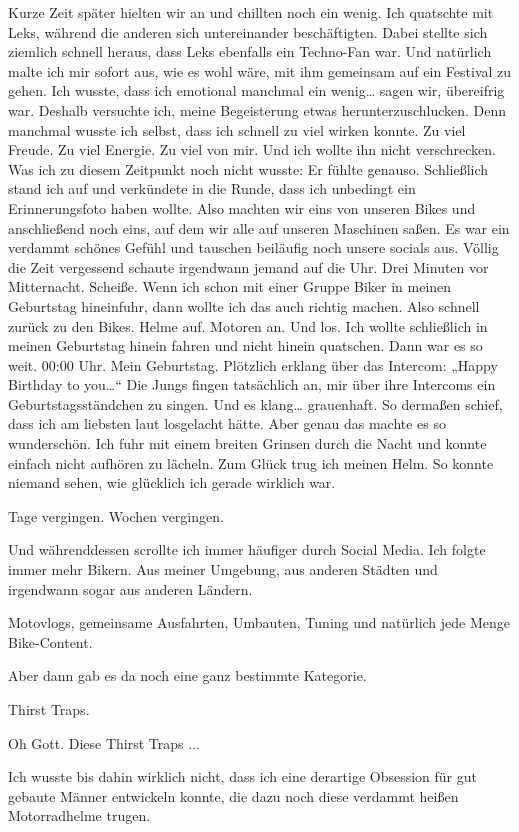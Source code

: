 Kurze Zeit später hielten wir an und chillten noch ein wenig.
Ich quatschte mit Leks, während die anderen sich untereinander beschäftigten. Dabei stellte sich ziemlich schnell heraus, dass Leks ebenfalls ein Techno-Fan war.
Und natürlich malte ich mir sofort aus, wie es wohl wäre, mit ihm gemeinsam auf ein Festival zu gehen.
Ich wusste, dass ich emotional manchmal ein wenig… sagen wir, übereifrig war. Deshalb versuchte ich, meine Begeisterung etwas herunterzuschlucken.
Denn manchmal wusste ich selbst, dass ich schnell zu viel wirken konnte.
Zu viel Freude.
Zu viel Energie.
Zu viel von mir.
Und ich wollte ihn nicht verschrecken.
Was ich zu diesem Zeitpunkt noch nicht wusste:
Er fühlte genauso.
Schließlich stand ich auf und verkündete in die Runde, dass ich unbedingt ein Erinnerungsfoto haben wollte.
Also machten wir eins von unseren Bikes und anschließend noch eins, auf dem wir alle auf unseren Maschinen saßen.
Es war ein verdammt schönes Gefühl und tauschen beiläufig noch unsere socials aus.
Völlig die Zeit vergessend schaute irgendwann jemand auf die Uhr.
Drei Minuten vor Mitternacht.
Scheiße.
Wenn ich schon mit einer Gruppe Biker in meinen Geburtstag hineinfuhr, dann wollte ich das auch richtig machen.
Also schnell zurück zu den Bikes.
Helme auf.
Motoren an.
Und los.
Ich wollte schließlich in meinen Geburtstag hinein fahren und nicht hinein quatschen.
Dann war es so weit.
00:00 Uhr.
Mein Geburtstag.
Plötzlich erklang über das Intercom:
„Happy Birthday to you…“
Die Jungs fingen tatsächlich an, mir über ihre Intercoms ein Geburtstagsständchen zu singen.
Und es klang…
grauenhaft.
So dermaßen schief, dass ich am liebsten laut losgelacht hätte.
Aber genau das machte es so wunderschön.
Ich fuhr mit einem breiten Grinsen durch die Nacht und konnte einfach nicht aufhören zu lächeln.
Zum Glück trug ich meinen Helm.
So konnte niemand sehen, wie glücklich ich gerade wirklich war.

Tage vergingen. Wochen vergingen.

Und währenddessen scrollte ich immer häufiger durch Social Media. Ich folgte immer mehr Bikern. Aus meiner Umgebung, aus anderen Städten und irgendwann sogar aus anderen Ländern.

Motovlogs, gemeinsame Ausfahrten, Umbauten, Tuning und natürlich jede Menge Bike-Content.

Aber dann gab es da noch eine ganz bestimmte Kategorie.

Thirst Traps.

Oh Gott. Diese Thirst Traps ...

Ich wusste bis dahin wirklich nicht, dass ich eine derartige Obsession für gut gebaute Männer entwickeln konnte, die dazu noch diese verdammt heißen Motorradhelme trugen.

